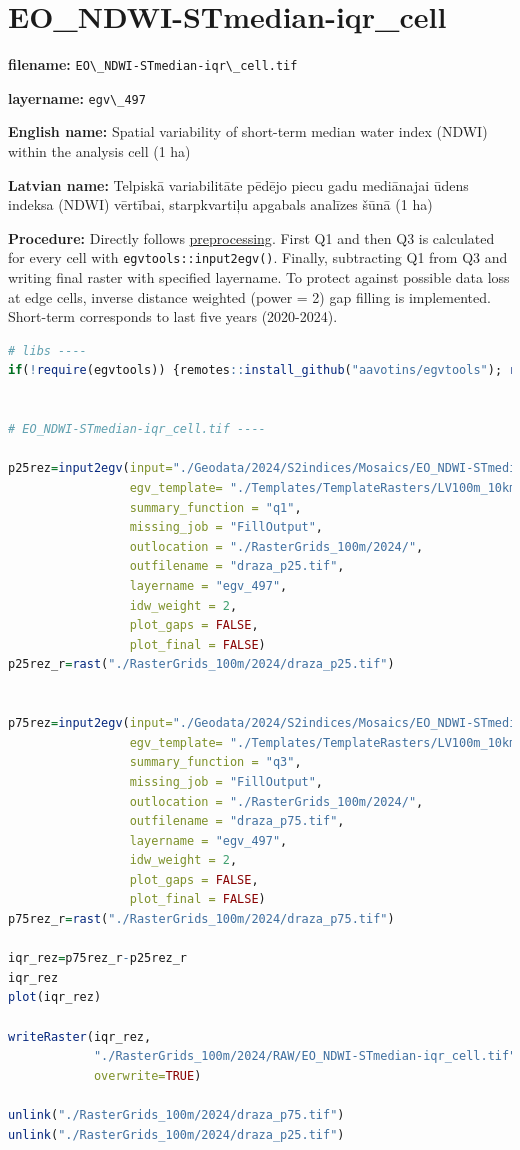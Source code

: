 \documentclass[
]{book}
\newcommand{\passthrough}[1]{#1}
\begin{document}
\section{EO\_NDWI-STmedian-iqr\_cell}\label{ch06.497}

\textbf{filename:} \passthrough{\lstinline!EO\_NDWI-STmedian-iqr\_cell.tif!}

\textbf{layername:} \passthrough{\lstinline!egv\_497!}

\textbf{English name:} Spatial variability of short-term median water index (NDWI) within the analysis cell (1 ha)

\textbf{Latvian name:} Telpiskā variabilitāte pēdējo piecu gadu mediānajai ūdens indeksa (NDWI) vērtībai, starpkvartiļu apgabals analīzes šūnā (1 ha)

\textbf{Procedure:} Directly follows \hyperref[Ch04.13]{preprocessing}. First Q1 and then Q3
is calculated for every cell with \passthrough{\lstinline!egvtools::input2egv()!}. Finally, subtracting
Q1 from Q3 and writing final raster with specified layername. To protect against possible data loss at edge cells,
inverse distance weighted (power = 2) gap filling is implemented. Short-term corresponds
to last five years (2020-2024).

\begin{lstlisting}[language=R]
# libs ----
if(!require(egvtools)) {remotes::install_github("aavotins/egvtools"); require(egvtools)}


# EO_NDWI-STmedian-iqr_cell.tif ----

p25rez=input2egv(input="./Geodata/2024/S2indices/Mosaics/EO_NDWI-STmedian.tif",
                 egv_template= "./Templates/TemplateRasters/LV100m_10km.tif",
                 summary_function = "q1",
                 missing_job = "FillOutput",
                 outlocation = "./RasterGrids_100m/2024/",
                 outfilename = "draza_p25.tif",
                 layername = "egv_497",
                 idw_weight = 2,
                 plot_gaps = FALSE,
                 plot_final = FALSE)
p25rez_r=rast("./RasterGrids_100m/2024/draza_p25.tif")


p75rez=input2egv(input="./Geodata/2024/S2indices/Mosaics/EO_NDWI-STmedian.tif",
                 egv_template= "./Templates/TemplateRasters/LV100m_10km.tif",
                 summary_function = "q3",
                 missing_job = "FillOutput",
                 outlocation = "./RasterGrids_100m/2024/",
                 outfilename = "draza_p75.tif",
                 layername = "egv_497",
                 idw_weight = 2,
                 plot_gaps = FALSE,
                 plot_final = FALSE)
p75rez_r=rast("./RasterGrids_100m/2024/draza_p75.tif")

iqr_rez=p75rez_r-p25rez_r
iqr_rez
plot(iqr_rez)

writeRaster(iqr_rez,
            "./RasterGrids_100m/2024/RAW/EO_NDWI-STmedian-iqr_cell.tif",
            overwrite=TRUE)

unlink("./RasterGrids_100m/2024/draza_p75.tif")
unlink("./RasterGrids_100m/2024/draza_p25.tif")
\end{lstlisting}
\end{document}
